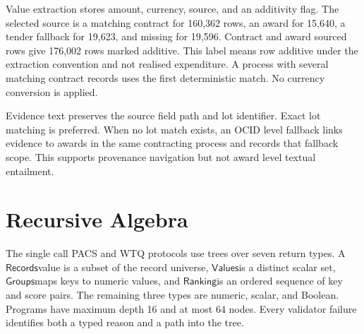 \documentclass{article}
\newcommand{\records}{\ensuremath{\mathsf{Records}}}
\newcommand{\values}{\ensuremath{\mathsf{Values}}}
\newcommand{\groups}{\ensuremath{\mathsf{Groups}}}
\newcommand{\ranking}{\ensuremath{\mathsf{Ranking}}}
\begin{document}
Value extraction stores amount, currency, source, and an additivity flag.  The selected source is a
matching contract for 160,362 rows, an award for 15,640, a tender fallback for 19,623, and missing
for 19,596.  Contract and award sourced rows give 176,002 rows marked additive.  This label means
row additive under the extraction convention and not realised expenditure.  A process with several
matching contract records uses the first deterministic match.  No currency conversion is applied.

Evidence text preserves the source field path and lot identifier.  Exact lot matching is preferred.
When no lot match exists, an OCID level fallback links evidence to awards in the same contracting
process and records that fallback scope.  This supports provenance navigation but not award level
textual entailment.

\section{Recursive Algebra}
\label{app:algebra}

The single call PACS and WTQ protocols use trees over seven return types.  A \records value is a
subset of the record universe, \values is a distinct scalar set, \groups maps keys to numeric
values, and \ranking is an ordered sequence of key and score pairs.  The remaining three types are
numeric, scalar, and Boolean.  Programs have maximum depth 16 and at most 64 nodes.  Every validator
failure identifies both a typed reason and a path into the tree.
\end{document}
